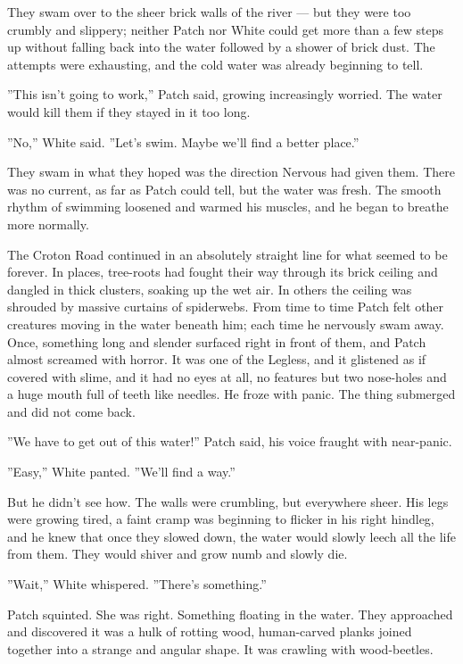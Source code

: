 \documentclass[12pt]{book}
\begin{document}
They swam over to the sheer brick walls of the river --- but they were
too crumbly and slippery; neither Patch nor White could get more than
a few steps up without falling back into the water followed by a
shower of brick dust. The attempts were exhausting, and the cold water
was already beginning to tell.

''This isn't going to work,'' Patch said, growing increasingly
worried. The water would kill them if they stayed in it too long.

''No,'' White said. ''Let's swim. Maybe we'll find a better place.''

They swam in what they hoped was the direction Nervous had given
them. There was no current, as far as Patch could tell, but the water
was fresh. The smooth rhythm of swimming loosened and warmed his
muscles, and he began to breathe more normally.

The Croton Road continued in an absolutely straight line for what
seemed to be forever. In places, tree-roots had fought their way
through its brick ceiling and dangled in thick clusters, soaking up
the wet air. In others the ceiling was shrouded by massive curtains of
spiderwebs. From time to time Patch felt other creatures moving in the
water beneath him; each time he nervously swam away. Once, something
long and slender surfaced right in front of them, and Patch almost
screamed with horror. It was one of the Legless, and it glistened as
if covered with slime, and it had no eyes at all, no features but two
nose-holes and a huge mouth full of teeth like needles. He froze with
panic. The thing submerged and did not come back.

''We have to get out of this water!'' Patch said, his voice fraught
with near-panic.

''Easy,'' White panted. ''We'll find a way.''

But he didn't see how. The walls were crumbling, but everywhere
sheer. His legs were growing tired, a faint cramp was beginning to
flicker in his right hindleg, and he knew that once they slowed down,
the water would slowly leech all the life from them. They would shiver
and grow numb and slowly die.

''Wait,'' White whispered. ''There's something.''

Patch squinted. She was right. Something floating in the water. They
approached and discovered it was a hulk of rotting wood, human-carved
planks joined together into a strange and angular shape. It was
crawling with wood-beetles.
\end{document}
